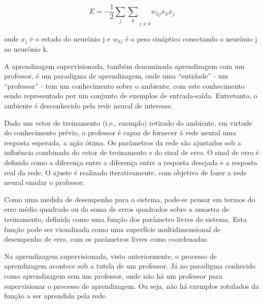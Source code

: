     \begin{equation}
        E = -\frac{1}{2}{\sum_{j}\sum_{k}}_{j \neq k}w_{kj}x_{k}x_{j}
    \end{equation}
    
    onde $x_{j}$ é o estado do neurônio j e $w_{kj}$ é o peso sináptico conectando o neurônio j ao neurônio k.
    
A aprendizagem supervisionada, também denominada aprendizagem com um professor, é um paradigma de aprendizagem, onde uma ``entidade'' - um ``professor'' - tem um conhecimento sobre o ambiente, com este conhecimento sendo representado por um conjunto de exemplos de entrada-saída. Entretanto, o ambiente é desconhecido pela rede neural de interesse. 

Dado um vetor de treinamento (i.e., exemplo) retirado do ambiente, em virtude do conhecimento prévio, o professor é capaz de fornecer à rede neural uma resposta esperada, a ação ótima. Os parâmetros da rede são ajustados sob a influência combinada do vetor de treinamento e do sinal de erro. O sinal de erro é definido como a diferença entre a diferença entre a resposta desejada e a resposta real da rede. O ajuste é realizado iterativamente, com objetivo de fazer a rede neural emular o professor.

Como uma medida de desempenho para o sistema, pode-se pensar em termos do erro médio quadrado ou da soma de erros quadrados sobre a amostra de treinamento, definida como uma função dos parâmetro livres do sistema. Esta função pode ser visualizada como uma superfície multidimensional de desempenho de erro, com os parâmetros livres como coordenadas.

Na aprendizagem supervisionada, visto anteriormente, o processo de aprendizagem acontece sob a tutela de um professor. Já no paradigma conhecido como aprendizagem sem um professor, onde não há um professor para supervisionar o processo de aprendizagem. Ou seja, não há exemplos rotulados da função a ser aprendida pela rede.

